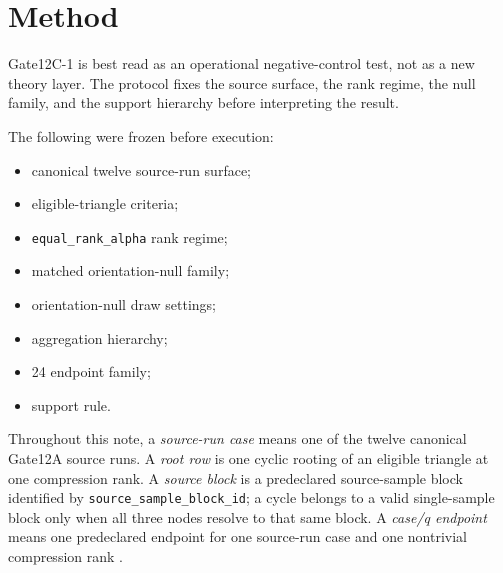 \documentclass[11pt]{article}
\newcommand{\code}[1]{\texttt{\detokenize{#1}}}
\newcommand{\breakcode}[1]{\begingroup\urlstyle{tt}\nolinkurl{#1}\endgroup}
\begin{document}
\section{Method}
\label{sec:method}

Gate12C-1 is best read as an operational negative-control test, not as a new
theory layer. The protocol fixes the source surface, the rank regime, the null
family, and the support hierarchy before interpreting the result.

The following were frozen before execution:

\begin{itemize}
    \item canonical twelve source-run surface;
    \item eligible-triangle criteria;
    \item \breakcode{equal_rank_alpha} rank regime;
    \item matched orientation-null family;
    \item orientation-null draw settings;
    \item aggregation hierarchy;
    \item 24 endpoint family;
    \item support rule.
\end{itemize}

Throughout this note, a \emph{source-run case} means one of the twelve
canonical Gate12A source runs. A \emph{root row} is one cyclic rooting of an
eligible triangle at one compression rank. A \emph{source block} is a
predeclared source-sample block identified by
\breakcode{source_sample_block_id}; a
cycle belongs to a valid single-sample block only when all three nodes resolve
to that same block. A \emph{case/q endpoint} means one predeclared endpoint for
one source-run case and one nontrivial compression rank \code{q}.
\end{document}

